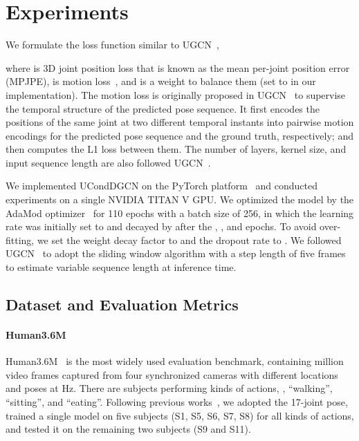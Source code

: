 \documentclass[sigconf]{acmart}
\begin{document}
\section{Experiments}
\label{sec:experiment}
We formulate the loss function similar to UGCN~\cite{wang2020motion}, 

where  is 3D joint position loss that is known as the mean per-joint position error (MPJPE),  is motion loss~\cite{wang2020motion}, and  is a weight to balance them (set to  in our implementation). 
The motion loss is originally proposed in UGCN~\cite{wang2020motion} to supervise the temporal structure of the predicted pose sequence. It first encodes the positions of the same joint at two different temporal instants into pairwise motion encodings for the predicted pose sequence and the ground truth, respectively; and then computes the L1 loss between them. 
The number of layers, kernel size, and input sequence length are also followed UGCN~\cite{wang2020motion}.


We implemented UCondDGCN on the PyTorch platform~\cite{paszke2019pytorch} and conducted experiments on a single NVIDIA TITAN V GPU.
We optimized the model by the AdaMod optimizer~\cite{ding2019adaptive} for 110 epochs with a batch size of 256, in which the learning rate was initially set to  and decayed by  after the , , and  epochs.
To avoid over-fitting, we set the weight decay factor to  and the dropout rate to .
We followed UGCN~\cite{wang2020motion} to adopt the sliding window algorithm with a step length of five frames to estimate variable sequence length at inference time.


\vspace{-2mm}
\subsection{Dataset and Evaluation Metrics}
\paragraph{Human3.6M}
Human3.6M~\cite{ionescu2013human3} is the most widely used evaluation benchmark, containing  million video frames captured from four synchronized cameras with different locations and poses at  Hz.
There are  subjects performing  kinds of actions, \eg, ``walking'', ``sitting'', and ``eating''.
Following previous works~\cite{pavlakos2017coarse,tekin2016direct,martinez2017simple,pavllo20193d,sun2017compositional,wang2020motion,cheng2019occlusion}, we adopted the 17-joint pose, trained a single model on five subjects (S1, S5, S6, S7, S8) for all kinds of actions, and tested it on the remaining two subjects (S9 and S11).
\end{document}

